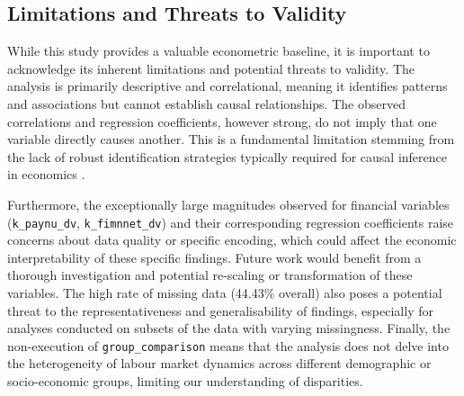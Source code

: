 \documentclass[11pt,a4paper]{article}
\begin{document}
\begin{table}[H]
    \centering
    \caption{OLS Regression Results (Top Models by R\textsuperscript{2})}
    \label{tab:regression_results}
\end{table}

\subsection{Limitations and Threats to Validity}

While this study provides a valuable econometric baseline, it is important to acknowledge its inherent limitations and potential threats to validity. The analysis is primarily descriptive and correlational, meaning it identifies patterns and associations but cannot establish causal relationships. The observed correlations and regression coefficients, however strong, do not imply that one variable directly causes another. This is a fundamental limitation stemming from the lack of robust identification strategies typically required for causal inference in economics \cite{ref2}.

Furthermore, the exceptionally large magnitudes observed for financial variables (\texttt{k\_paynu\_dv}, \texttt{k\_fimnnet\_dv}) and their corresponding regression coefficients raise concerns about data quality or specific encoding, which could affect the economic interpretability of these specific findings. Future work would benefit from a thorough investigation and potential re-scaling or transformation of these variables. The high rate of missing data (44.43\% overall) also poses a potential threat to the representativeness and generalisability of findings, especially for analyses conducted on subsets of the data with varying missingness. Finally, the non-execution of \texttt{group\_comparison} means that the analysis does not delve into the heterogeneity of labour market dynamics across different demographic or socio-economic groups, limiting our understanding of disparities.
\end{document}

